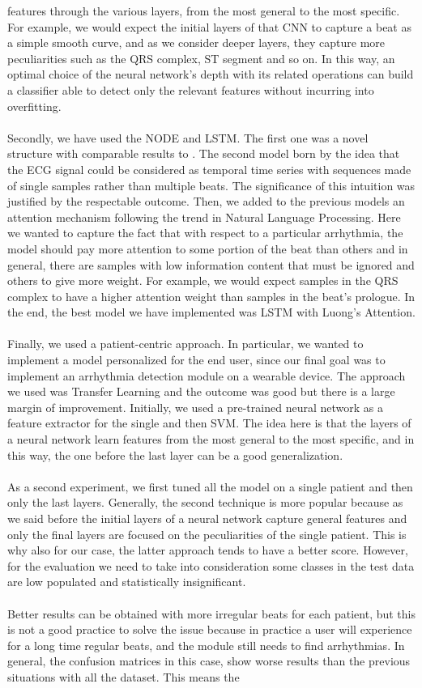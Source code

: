 \documentclass[LaM,binding=0.6cm]{sapthesis}
\begin{document}
features through the various layers, from the most general to the most specific. For example, we would expect the initial layers of that CNN to capture a beat as a simple smooth curve, and as we consider deeper layers, they capture more peculiarities such as the QRS complex, ST segment and so on. In this way, an optimal choice of the neural network's depth with its related operations can build a classifier able to detect only the relevant features without incurring into overfitting.\\\\Secondly, we have used the NODE and LSTM. The first one was a novel structure with comparable results to \cite{cnnfazeli}. The second model born by the idea that the ECG signal could be considered as temporal time series with sequences made of single samples rather than multiple beats. The significance of this intuition was justified by the respectable outcome. Then, we added to the previous models an attention mechanism following the trend in Natural Language Processing. Here we wanted to capture the fact that with respect to a particular arrhythmia, the model should pay more attention to some portion of the beat than others and in general, there are samples with low information content that must be ignored and others to give more weight. For example, we would expect samples in the QRS complex to have a higher attention weight than samples in the beat's prologue. In the end, the best model we have implemented was LSTM with Luong's Attention.\\\\Finally, we used a patient-centric approach. In particular, we wanted to implement a model personalized for the end user, since our final goal was to implement an arrhythmia detection module on a wearable device. The approach we used was Transfer Learning and the outcome was good but there is a large margin of improvement. Initially, we used a pre-trained neural network as a feature extractor for the single and then SVM. The idea here is that the layers of a neural network learn features from the most general to the most specific, and in this way, the one before the last layer can be a good generalization.\\\\As a second experiment, we first tuned all the model on a single patient and then only the last layers. Generally, the second technique is more popular because as we said before the initial layers of a neural network capture general features and only the final layers are focused on the peculiarities of the single patient. This is why also for our case, the latter approach tends to have a better score. However, for the evaluation we need to take into consideration some classes in the test data are low populated and statistically insignificant.\\\\Better results can be obtained with more irregular beats for each patient, but this is not a good practice to solve the issue because in practice a user will experience for a long time regular beats, and the module still needs to find arrhythmias. In general, the confusion matrices in this case, show worse results than the previous situations with all the dataset. This means the 
\end{document}
